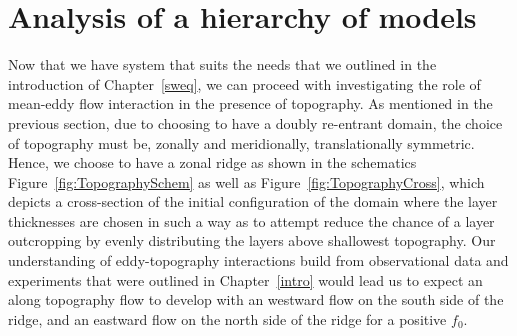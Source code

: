 \documentclass[12pt,a4paper]{report}
\newcommand*\figref[1]{Figure~\ref{#1}}
\begin{document}
\chapter{Analysis of a hierarchy of models}
\label{analysis}

Now that we have system that suits the needs that we outlined in the
introduction of Chapter~\ref{sweq}, we can proceed with investigating the
role of mean-eddy flow interaction in the presence of topography.
As mentioned in the previous section, due to choosing to have a doubly re-entrant
domain, the choice of topography must be, zonally and meridionally, 
translationally symmetric.
Hence, we choose to have a zonal ridge as shown in the schematics
 \figref{fig:TopographySchem} as well as \figref{fig:TopographyCross}, which
 depicts a cross-section of the initial configuration of the domain where
 the layer thicknesses are chosen in such a way as to attempt reduce the chance of a
 layer outcropping by evenly distributing the layers above shallowest topography. Our
 understanding of eddy-topography interactions build from observational 
 data and experiments that were outlined in Chapter~\ref{intro} would lead us
 to expect an along topography flow to develop with an westward flow on the south side of
 the ridge, and an eastward flow on the north side of the ridge for a positive $f_{0}$.
\end{document}

